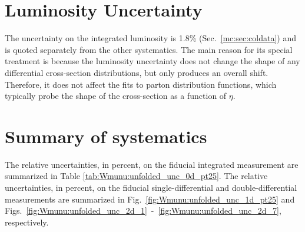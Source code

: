 

\section{Luminosity Uncertainty}
The uncertainty on the integrated luminosity is 1.8\% (Sec.~\ref{mc:sec:coldata}) and is quoted separately from the other systematics. The main reason for its special treatment is because the luminosity uncertainty does not change the shape of any differential cross-section distributions, but only produces an overall shift. Therefore, it does not affect the fits to parton distribution functions, which typically probe the shape of the cross-section as a function of $\eta$.

\section{Summary of systematics}

The relative uncertainties, in percent, on the fiducial integrated measurement are summarized in Table \ref{tab:Wmunu:unfolded_unc_0d_pt25}. The relative uncertainties, in percent, on the fiducial single-differential and double-differential measurements are summarized in Fig.~\ref{fig:Wmunu:unfolded_unc_1d_pt25} and Figs.~\ref{fig:Wmunu:unfolded_unc_2d_1}~-~\ref{fig:Wmunu:unfolded_unc_2d_7}, respectively.

